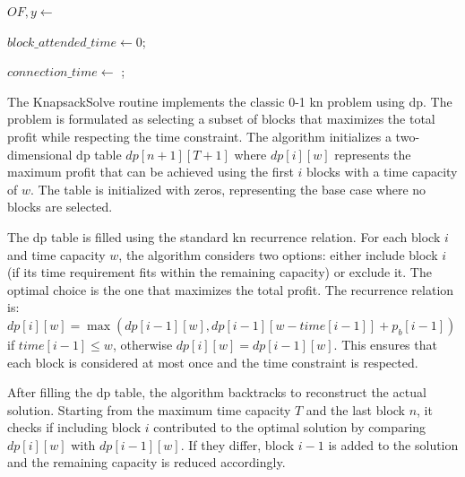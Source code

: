 \begin{algorithm}[h!]
	\caption{BinarySolve}
	\SetAlgoLined

	$OF, y \leftarrow$ \;

	$block\_attended\_time \leftarrow 0$; 

	$connection\_time \leftarrow$ ; 

	\;
\end{algorithm}

The KnapsackSolve routine implements the classic 0-1 \gls{kn} problem using \gls{dp}. The problem is formulated as selecting a subset of blocks that maximizes the total profit while respecting the time constraint. The algorithm initializes a two-dimensional \gls{dp} table $dp[n+1][T+1]$ where $dp[i][w]$ represents the maximum profit that can be achieved using the first $i$ blocks with a time capacity of $w$. The table is initialized with zeros, representing the base case where no blocks are selected.

The \gls{dp} table is filled using the standard \gls{kn} recurrence relation. For each block $i$ and time capacity $w$, the algorithm considers two options: either include block $i$ (if its time requirement fits within the remaining capacity) or exclude it. The optimal choice is the one that maximizes the total profit. The recurrence relation is: $dp[i][w] = \max(dp[i-1][w], dp[i-1][w-time[i-1]] + p_b[i-1])$ if $time[i-1] \leq w$, otherwise $dp[i][w] = dp[i-1][w]$. This ensures that each block is considered at most once and the time constraint is respected.

After filling the \gls{dp} table, the algorithm backtracks to reconstruct the actual solution. Starting from the maximum time capacity $T$ and the last block $n$, it checks if including block $i$ contributed to the optimal solution by comparing $dp[i][w]$ with $dp[i-1][w]$. If they differ, block $i-1$ is added to the solution and the remaining capacity is reduced accordingly.

